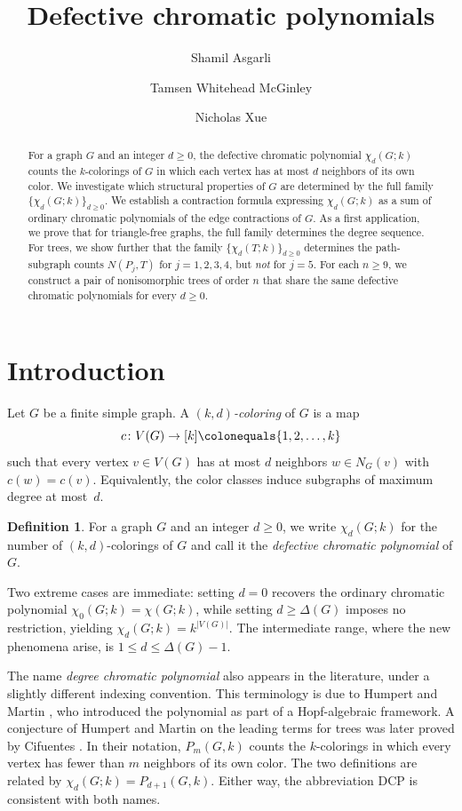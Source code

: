 \documentclass[12pt,reqno]{amsart}
\title{Defective chromatic polynomials}
\author{Shamil Asgarli}
\author{Tamsen Whitehead McGinley}
\author{Nicholas Xue}
\theoremstyle{definition}
\newtheorem{defn}[thm]{Definition}
\begin{document}
\begin{abstract}
For a graph $G$ and an integer $d\geq 0$, the defective chromatic polynomial $\chi_d(G;k)$ counts the $k$-colorings of $G$ in which each vertex has at most $d$ neighbors of its own color. We investigate which structural properties of $G$ are determined by the full family $\{\chi_d(G;k)\}_{d\geq 0}$. We establish a contraction formula expressing $\chi_d(G;k)$ as a sum of ordinary chromatic polynomials of the edge contractions of $G$. As a first application, we prove that for triangle-free graphs, the full family determines the degree sequence. For trees, we show further that the family $\{\chi_d(T;k)\}_{d\geq 0}$ determines the path-subgraph counts $N(P_j,T)$ for $j=1,2,3,4$, but \emph{not} for $j=5$. For each $n\geq 9$, we construct a pair of nonisomorphic trees of order $n$ that share the same defective chromatic polynomials for every $d\geq 0$.
\end{abstract}

\maketitle

\section{Introduction}

Let $G$ be a finite simple graph. A \emph{$(k,d)$-coloring} of $G$ is a map
\[
c\colon V(G)\to [k]\colonequals \{1,2,\dots,k\}
\]
such that every vertex $v\in V(G)$ has at most $d$ neighbors $w\in N_G(v)$ with $c(w)=c(v)$. Equivalently, the color classes induce subgraphs of maximum degree at most~$d$.

\begin{defn}
For a graph $G$ and an integer $d\geq 0$, we write $\chi_d(G;k)$ for the number of $(k,d)$-colorings of $G$ and call it the \emph{defective chromatic polynomial} of $G$.
\end{defn}

Two extreme cases are immediate: setting $d=0$ recovers the ordinary chromatic polynomial $\chi_0(G;k)=\chi(G;k)$, while setting $d\geq \Delta(G)$ imposes no restriction, yielding $\chi_d(G;k)=k^{|V(G)|}$. The intermediate range, where the new phenomena arise, is $1\leq d\leq \Delta(G)-1$.

The name \emph{degree chromatic polynomial} also appears in the literature, under a slightly different indexing convention. This terminology is due to Humpert and Martin \cite{HM12}, who introduced the polynomial as part of a Hopf-algebraic framework. A conjecture of Humpert and Martin on the leading terms for trees was later proved by Cifuentes \cite{Cif11, Cif12}. In their notation, $P_m(G,k)$ counts the $k$-colorings in which every vertex has fewer than $m$ neighbors of its own color. The two definitions are related by $\chi_d(G;k)=P_{d+1}(G,k)$. Either way, the abbreviation DCP is consistent with both names.
\end{document}

